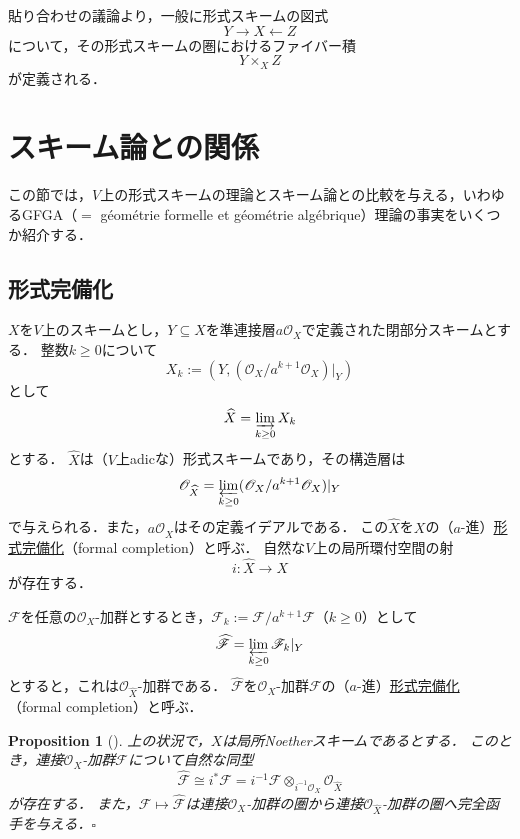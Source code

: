 \documentclass[a4paper,12pt, dvipdfmx]{jsbook}
\def\O{\mathscr{O}}
\theoremstyle{plain}
\newtheorem{prop}[thm]{\bfseries Proposition}
\theoremstyle{definition}
\begin{document}
貼り合わせの議論より，一般に形式スキームの図式
$$
Y\longrightarrow X\longleftarrow Z
$$
について，その形式スキームの圏におけるファイバー積
$$
Y\times_XZ
$$
が定義される．

\section{スキーム論との関係}\label{sec-GFGA}
この節では，$V$上の形式スキームの理論とスキーム論との比較を与える，いわゆるGFGA（$=$ g\'eom\'etrie formelle et g\'eom\'etrie alg\'ebrique）理論の事実をいくつか紹介する．

\subsection{形式完備化}\label{sub-formalcompletion}
$X$を$V$上のスキームとし，$Y\subseteq X$を準連接層$a\O_X$で定義された閉部分スキームとする．
整数$k\geq 0$について
$$
X_k:=(Y,(\O_X/a^{k+1}\O_X)|_Y)
$$
として
$$
\widehat{X}=\varinjlim_{k\geq 0}X_k
$$
とする．
$\widehat{X}$は（$V$上adicな）形式スキームであり，その構造層は
$$
\O_{\widehat{X}}=\varprojlim_{k\geq 0}(\O_X/a^{k+1}\O_X)|_Y
$$
で与えられる．また，$a\O_{\widehat{X}}$はその定義イデアルである．
この$\widehat{X}$を$X$の（$a$-進）\underline{形式完備化}（formal completion）と呼ぶ．
自然な$V$上の局所環付空間の射
$$
i\colon\widehat{X}\longrightarrow X
$$
が存在する．

$\mathscr{F}$を任意の$\O_X$-加群とするとき，$\mathscr{F}_k:=\mathscr{F}/a^{k+1}\mathscr{F}$（$k\geq 0$）として
$$
\widehat{\mathscr{F}}=\varprojlim_{k\geq 0}\mathscr{F}_k|_Y
$$
とすると，これは$\O_{\widehat{X}}$-加群である．
$\widehat{\mathscr{F}}$を$\O_X$-加群$\mathscr{F}$の（$a$-進）\underline{形式完備化}（formal completion）と呼ぶ．

\begin{prop}[{\rm \cite[Chap.\ II, Cor.\ 9.8]{Hart2}}]\label{prop-formalcompletion}{\rm 
上の状況で，$X$は局所Noetherスキームであるとする．
このとき，連接$\O_X$-加群$\mathscr{F}$について自然な同型
$$
\widehat{\mathscr{F}}\cong i^{\ast}\mathscr{F}=i^{-1}\mathscr{F}\otimes_{i^{-1}\O_X}\O_{\widehat{X}}
$$
が存在する．
また，$\mathscr{F}\mapsto\widehat{\mathscr{F}}$は連接$\O_X$-加群の圏から連接$\O_{\widehat{X}}$-加群の圏へ完全函手を与える．}\hfill$\square$
\end{prop}
\end{document}
